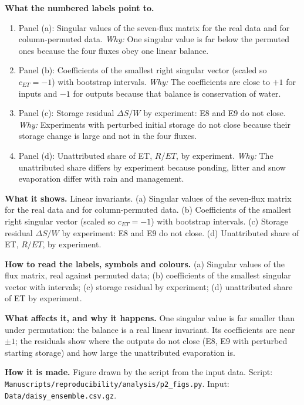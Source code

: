 \textbf{What the numbered labels point to.}
\begin{enumerate}[nosep,label=\protect\circled{\arabic*}]
\item Panel (a): Singular values of the seven-flux matrix for the real data and for column-permuted data. \emph{Why:} One singular value is far below the permuted ones because the four fluxes obey one linear balance.
\item Panel (b): Coefficients of the smallest right singular vector (scaled so $c_{\mathit{ET}}=-1$) with bootstrap intervals. \emph{Why:} The coefficients are close to $+1$ for inputs and $-1$ for outputs because that balance is conservation of water.
\item Panel (c): Storage residual $\Delta S/W$ by experiment: E8 and E9 do not close. \emph{Why:} Experiments with perturbed initial storage do not close because their storage change is large and not in the four fluxes.
\item Panel (d): Unattributed share of ET, $R/\mathit{ET}$, by experiment. \emph{Why:} The unattributed share differs by experiment because ponding, litter and snow evaporation differ with rain and management.
\end{enumerate}

\textbf{What it shows.} Linear invariants. (a) Singular values of the seven-flux matrix for the real data and for column-permuted data. (b) Coefficients of the smallest right singular vector (scaled so $c_{\mathit{ET}}=-1$) with bootstrap intervals. (c) Storage residual $\Delta S/W$ by experiment: E8 and E9 do not close. (d) Unattributed share of ET, $R/\mathit{ET}$, by experiment.

\textbf{How to read the labels, symbols and colours.} (a) Singular values of the flux matrix, real against permuted data; (b) coefficients of the smallest singular vector with intervals; (c) storage residual by experiment; (d) unattributed share of ET by experiment.

\textbf{What affects it, and why it happens.} One singular value is far smaller than under permutation: the balance is a real linear invariant. Its coefficients are near $\pm1$; the residuals show where the outputs do not close (E8, E9 with perturbed starting storage) and how large the unattributed evaporation is.

\textbf{How it is made.} Figure drawn by the script from the input data. Script: \nolinkurl{Manuscripts/reproducibility/analysis/p2_figs.py}. Input: \nolinkurl{Data/daisy_ensemble.csv.gz}.

